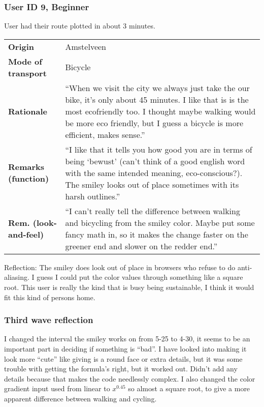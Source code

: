\documentclass[final,a4paper,11pt]{article}
\newlength{\resulttablecolone}
\newlength{\resulttablecoltwo}
\begin{document}
\subsubsection*{User ID 9, Beginner}
User had their route plotted in about 3 minutes.
\begin{table}[H]
\begin{tabular}{p{\resulttablecolone}|p{\resulttablecoltwo}}
\textbf{Origin} & Amstelveen \\
\textbf{Mode of transport} & Bicycle \\
\textbf{Rationale} & ``When we visit the city we always just take the our bike, it's only about 45 minutes. I like that is is the most ecofriendly too. I thought maybe walking would be more eco friendly, but I guess a bicycle is more efficient, makes sense.'' \\
\textbf{Remarks (function)} & ``I like that it tells you how good you are in terms of being `bewust' (can't think of a good english word with the same intended meaning, eco-conscious?). The smiley looks out of place sometimes with its harsh outlines.'' \\
\textbf{Rem. (look-and-feel)} & ``I can't really tell the difference between walking and bicycling from the smiley color. Maybe put some fancy math in, so it makes the change faster on the greener end and slower on the redder end.'' \\
\end{tabular}
\end{table}
Reflection: The smiley does look out of place in browsers who refuse to do anti-aliasing. I guess I could put the color values through something like a square root. This user is really the kind that is busy being sustainable, I think it would fit this kind of persons home.

\subsubsection*{Third wave reflection}
I changed the interval the smiley works on from 5-25 to 4-30, it seems to be an important part in deciding if something is ``bad''.
 I have looked into making it look more ``cute'' like giving is a round face or extra details, but it was some trouble with getting the formula's right, but it worked out.
 Didn't add any details because that makes the code needlessly complex.
 I also changed the color gradient input used from linear to $x^0.45$ so almost a square root, to give a more apparent difference between walking and cycling.
\end{document}
